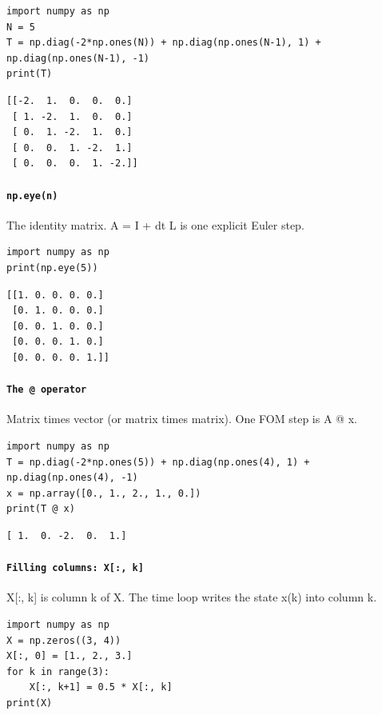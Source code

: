 \begin{lstlisting}[style=py]
import numpy as np
N = 5
T = np.diag(-2*np.ones(N)) + np.diag(np.ones(N-1), 1) + np.diag(np.ones(N-1), -1)
print(T)
\end{lstlisting}

\begin{lstlisting}[style=out]
[[-2.  1.  0.  0.  0.]
 [ 1. -2.  1.  0.  0.]
 [ 0.  1. -2.  1.  0.]
 [ 0.  0.  1. -2.  1.]
 [ 0.  0.  0.  1. -2.]]
\end{lstlisting}

\paragraph{\texttt{np.eye(n)}} The identity matrix. A = I + dt L is one explicit Euler step.

\begin{lstlisting}[style=py]
import numpy as np
print(np.eye(5))
\end{lstlisting}

\begin{lstlisting}[style=out]
[[1. 0. 0. 0. 0.]
 [0. 1. 0. 0. 0.]
 [0. 0. 1. 0. 0.]
 [0. 0. 0. 1. 0.]
 [0. 0. 0. 0. 1.]]
\end{lstlisting}

\paragraph{\texttt{The @ operator}} Matrix times vector (or matrix times matrix). One FOM step is A @ x.

\begin{lstlisting}[style=py]
import numpy as np
T = np.diag(-2*np.ones(5)) + np.diag(np.ones(4), 1) + np.diag(np.ones(4), -1)
x = np.array([0., 1., 2., 1., 0.])
print(T @ x)
\end{lstlisting}

\begin{lstlisting}[style=out]
[ 1.  0. -2.  0.  1.]
\end{lstlisting}

\paragraph{\texttt{Filling columns: X[:, k]}} X[:, k] is column k of X. The time loop writes the state x(k) into column k.

\begin{lstlisting}[style=py]
import numpy as np
X = np.zeros((3, 4))
X[:, 0] = [1., 2., 3.]
for k in range(3):
    X[:, k+1] = 0.5 * X[:, k]
print(X)
\end{lstlisting}

